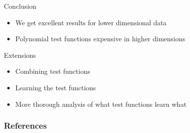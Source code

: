 \documentclass{beamer}
\begin{document}
\begin{frame}
	\begin{block}{Conclusion}
		\begin{itemize}
			\item We get excellent results for lower dimensional data
			\item Polynomial test functions expensive in higher dimensions
		\end{itemize}
	\end{block}
	\begin{block}{Extensions}
		\begin{itemize}
			\item Combining test functions
			\item Learning the test functions
			\item More thorough analysis of what test functions learn what
		\end{itemize}
	\end{block}
\end{frame}

\begin{frame}[allowframebreaks]
	\frametitle{References}
	\nocite{*}
	\printbibliography

\end{frame}
\end{document}
